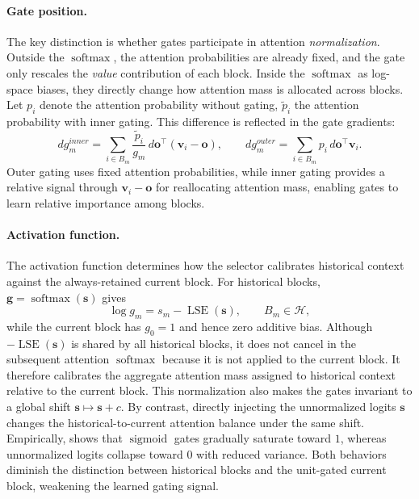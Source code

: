 \paragraph{Gate position.}
The key  distinction is whether gates participate in attention \textit{normalization}.
Outside the $\operatorname{softmax}$, the attention probabilities are already fixed, and the gate only rescales the \emph{value} contribution of each block.
Inside the $\operatorname{softmax}$ as log-space biases, they directly change how attention mass is allocated across blocks.
Let $p_i$ denote the attention probability without gating, $\tilde p_i$ the attention probability with inner gating.
This difference is reflected in the gate gradients:
\begin{equation}
dg_m^{inner}
=
\sum_{i\in B_m}
\frac{\tilde p_i}{g_m}\,
d\mathbf{o}^{\top}
(\mathbf{v}_i-\mathbf{o}),
\qquad
dg_m^{outer}
=
\sum_{i\in B_m}
p_i\, d\mathbf{o}^{\top}\mathbf{v}_i.
\label{eq:gate_posi}
\end{equation}
Outer gating uses fixed attention probabilities, while inner gating provides a relative signal through $\mathbf{v}_i-\mathbf{o}$ for reallocating attention mass, enabling gates to learn relative importance among blocks.


\paragraph{Activation function.}
The activation function determines how the selector calibrates historical context against the always-retained current block. For historical blocks, $\mathbf{g}=\operatorname{softmax}(\mathbf{s})$ gives
\begin{equation}
    \log g_m=s_m-\operatorname{LSE}(\mathbf{s}),
    \qquad B_m\in\mathcal{H},
    \label{eq:normalized_log_gate}
\end{equation}
while the current block has $g_0=1$ and hence zero additive bias. Although $-\operatorname{LSE}(\mathbf{s})$ is shared by all historical blocks, it does not cancel in the subsequent attention $\operatorname{softmax}$ because it is not applied to the current block. It therefore calibrates the aggregate attention mass assigned to historical context relative to the current block. This normalization also makes the gates invariant to a global shift $\mathbf{s}\mapsto\mathbf{s}+c$. By contrast, directly injecting the unnormalized logits $\mathbf{s}$ changes the historical-to-current attention balance under the same shift. Empirically,  shows that $\operatorname{sigmoid}$ gates gradually saturate toward $1$, whereas unnormalized logits collapse toward $0$ with reduced variance. Both behaviors diminish the distinction between historical blocks and the unit-gated current block, weakening the learned gating signal.

